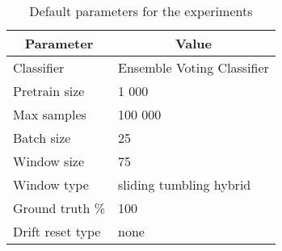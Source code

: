 \begin{table}[]
\centering
\caption{\label{table:default_exp_parameters}Default parameters for the experiments}
\begin{tabular}{|l|l|}
\hline
\multicolumn{1}{|c|}{\textbf{Parameter}} & \multicolumn{1}{c|}{\textbf{Value}} \\ \hline \hhline{==}
Classifier & Ensemble Voting Classifier \\ \hline
Pretrain size & 1 000 \\ \hline
Max samples & 100 000 \\ \hline
Batch size & 25 \\ \hline
Window size & 75 \\ \hline
Window type & sliding tumbling hybrid \\ \hline
Ground truth \% & 100 \\ \hline
Drift reset type & none \\ \hline
\end{tabular}
\end{table}

